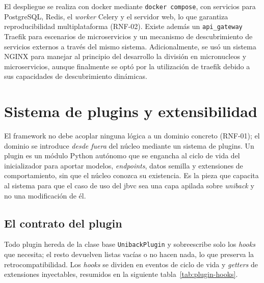 El despliegue se realiza con \gls{docker} mediante \texttt{docker compose},
con servicios para PostgreSQL, Redis, el \emph{worker} Celery y el servidor
web, lo que garantiza reproducibilidad multiplataforma (RNF-02). Existe
además un \texttt{api\_gateway} Traefik para escenarios de
microservicios y un mecanismo de descubrimiento de servicios externos a
través del mismo sistema. Adicionalmente, se usó un sistema NGINX para
manejar al principio del desarrollo la división en micronucleos y microservicios, 
aunque finalmente se optó por la utilización de traefik debido a sus capacidades
de descubrimiento dinámicas.

\section{Sistema de plugins y extensibilidad}\label{sec:plugins}
El framework no debe acoplar ninguna lógica a un dominio concreto (RNF-01); el
dominio se introduce \emph{desde fuera} del núcleo mediante un sistema de
\gls{plugin}s. Un plugin es un módulo Python autónomo que se engancha al ciclo
de vida del inicializador para aportar modelos, \emph{endpoints}, datos semilla
y extensiones de comportamiento, sin que el núcleo conozca su existencia. Es la
pieza que capacita al sistema para que el caso de uso del \gls{jbvc} sea una capa apilada
sobre \emph{uniback} y no una modificación de él.

\subsection{El contrato del plugin}
Todo plugin hereda de la clase base \texttt{UnibackPlugin} y sobreescribe solo
los \emph{hooks} que necesita; el resto devuelven listas vacías o no hacen nada,
lo que preserva la retrocompatibilidad. Los \emph{hooks} se dividen en eventos
de ciclo de vida y \emph{getters} de extensiones inyectables, resumidos en la siguiente
tabla~\ref{tab:plugin-hooks}.

